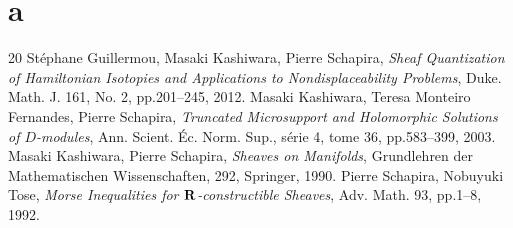 \section{a}
\begin{thebibliography}{20} 
   St\'ephane Guillermou, 
  Masaki Kashiwara, Pierre Schapira, 
  \textit{Sheaf Quantization of Hamiltonian Isotopies and Applications to Nondisplaceability Problems}, 
  Duke. Math. J. 161, No. 2, pp.201--245, 2012.  
   Masaki Kashiwara, Teresa Monteiro Fernandes, Pierre Schapira, 
    \textit{Truncated Microsupport and Holomorphic Solutions 
    of \(D\)-modules}, 
    Ann. Scient. \'Ec. Norm. Sup., s\'erie 4, tome 36, 
    pp.583--399, 2003.
   Masaki Kashiwara, Pierre Schapira, 
    \textit{Sheaves on Manifolds}, 
    Grundlehren der Mathematischen Wissenschaften, 292, Springer, 1990.
   Pierre Schapira, Nobuyuki Tose, 
    \textit{Morse Inequalities for \(\mathbf{R}\)-constructible Sheaves}, 
    Adv. Math. 93, pp.1--8, 1992. 
\end{thebibliography}



